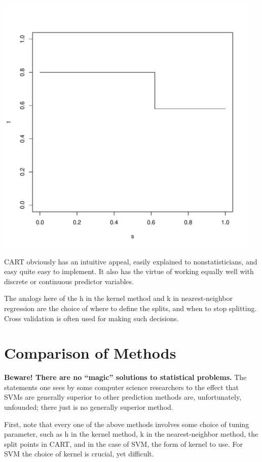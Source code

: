 \includegraphics[width=5.0in]{CARTBound.pdf}

CART obviously has an intuitive appeal, easily explained to
nonstatisticians, and easy quite easy to implement.  It also has the
virtue of working equally well with discrete or continuous predictor
variables.

The analogs here of the h in the kernel method and k in nearest-neighbor
regression are the choice of where to define the splits, and when to stop
splitting.  Cross validation is often used for making such decisions.

\section{Comparison of Methods}

{\bf Beware!  There are no ``magic'' solutions to statistical problems.}
The statements one sees by some computer science researchers to the
effect that SVMs are generally superior to other prediction methods are,
unfortunately, unfounded; there just is no generally superior method.  

First, note that every one of the above methods involves some choice of
tuning parameter, such as h in the kernel method, k in the
nearest-neighbor method, the split points in CART, and in the case of
SVM, the form of kernel to use.  For SVM the choice of kernel is
crucial, yet difficult.

